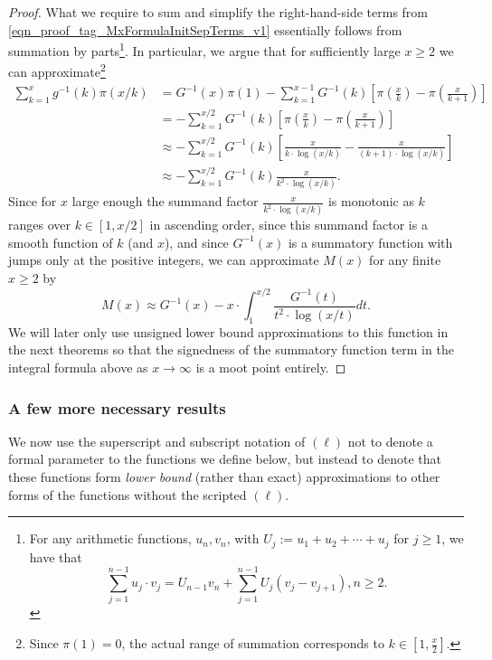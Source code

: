 \documentclass[11pt,reqno,a4letter]{article}
\numberwithin{figure}{section}
\numberwithin{table}{section}
\theoremstyle{plain}
\numberwithin{theorem}{section}
\theoremstyle{definition}
\begin{document}
\begin{proof}
What we require to sum and simplify the right-hand-side terms from 
\eqref{eqn_proof_tag_MxFormulaInitSepTerms_v1} essentially follows from 
summation by parts\footnote{
     For any arithmetic functions, $u_n,v_n$, 
     with $U_j := u_1+u_2+\cdots+u_j$ for $j \geq 1$, we have that 
     \cite[\S 2.10(ii)]{NISTHB} 
     \[
     \sum_{j=1}^{n-1} u_j \cdot v_j = U_{n-1} v_n + 
          \sum_{j=1}^{n-1} U_j \left(v_j - v_{j+1}\right), n \geq 2. 
     \]
}. 
In particular, we argue that for sufficiently large 
$x \geq 2$ we can approximate\footnote{
     Since $\pi(1) = 0$, the actual range of summation corresponds to 
     $k \in \left[1, \frac{x}{2}\right]$. 
}
\begin{align*} 
\sum_{k=1}^{x} g^{-1}(k) \pi(x/k) & = G^{-1}(x) \pi(1) - \sum_{k=1}^{x-1} G^{-1}(k) \left[ 
     \pi\left(\frac{x}{k}\right) - \pi\left(\frac{x}{k+1}\right)\right] \\ 
     & = -\sum_{k=1}^{x/2} G^{-1}(k) \left[ 
     \pi\left(\frac{x}{k}\right) - \pi\left(\frac{x}{k+1}\right)\right] \\ 
     & \approx -\sum_{k=1}^{x/2} G^{-1}(k) \left[ 
     \frac{x}{k \cdot \log(x/k)} - \frac{x}{(k+1) \cdot \log(x/k)}\right] \\ 
     & \approx -\sum_{k=1}^{x/2} G^{-1}(k) \frac{x}{k^2 \cdot \log(x/k)}. 
\end{align*} 
Since for $x$ large enough the summand factor $\frac{x}{k^2 \cdot \log(x/k)}$ 
is monotonic as $k$ ranges over $k \in [1, x/2]$ in ascending order, since this 
summand factor is a smooth function of $k$ (and $x$), and since $G^{-1}(x)$ is 
a summatory function with jumps only at the positive integers, we can approximate 
$M(x)$ for any finite $x \geq 2$ by 
\[
M(x) \approx G^{-1}(x) - x \cdot \int_1^{x/2} \frac{G^{-1}(t)}{t^2 \cdot \log(x/t)} dt. 
\]
We will later only use unsigned lower bound approximations to this function in the next theorems so that 
the signedness of the summatory function term in the integral formula above 
as $x \rightarrow \infty$ is a moot point entirely. 
\end{proof} 

\subsubsection{A few more necessary results} 
\label{subsubSection_RoutineProofsNeededForMainBoundOnGInvxFunc} 

We now use the superscript and subscript notation of 
$(\ell)$ not to denote a formal parameter to 
the functions we define below, but instead to denote that these functions form 
\emph{lower bound} (rather than exact) 
approximations to other forms of the functions without the scripted $(\ell)$. 
\end{document}
